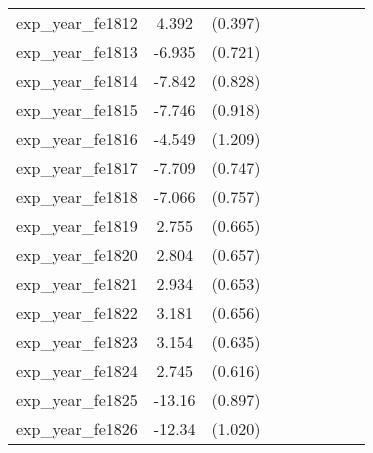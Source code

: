 {\begin{tabular}{l*{4}{cc}}
exp\_year\_fe1812&    4.392\sym{***}&  (0.397)&                  &         &                  &         &                  &         \\
exp\_year\_fe1813&   -6.935\sym{***}&  (0.721)&                  &         &                  &         &                  &         \\
exp\_year\_fe1814&   -7.842\sym{***}&  (0.828)&                  &         &                  &         &                  &         \\
exp\_year\_fe1815&   -7.746\sym{***}&  (0.918)&                  &         &                  &         &                  &         \\
exp\_year\_fe1816&   -4.549\sym{***}&  (1.209)&                  &         &                  &         &                  &         \\
exp\_year\_fe1817&   -7.709\sym{***}&  (0.747)&                  &         &                  &         &                  &         \\
exp\_year\_fe1818&   -7.066\sym{***}&  (0.757)&                  &         &                  &         &                  &         \\
exp\_year\_fe1819&    2.755\sym{***}&  (0.665)&                  &         &                  &         &                  &         \\
exp\_year\_fe1820&    2.804\sym{***}&  (0.657)&                  &         &                  &         &                  &         \\
exp\_year\_fe1821&    2.934\sym{***}&  (0.653)&                  &         &                  &         &                  &         \\
exp\_year\_fe1822&    3.181\sym{***}&  (0.656)&                  &         &                  &         &                  &         \\
exp\_year\_fe1823&    3.154\sym{***}&  (0.635)&                  &         &                  &         &                  &         \\
exp\_year\_fe1824&    2.745\sym{***}&  (0.616)&                  &         &                  &         &                  &         \\
exp\_year\_fe1825&   -13.16\sym{***}&  (0.897)&                  &         &                  &         &                  &         \\
exp\_year\_fe1826&   -12.34\sym{***}&  (1.020)&                  &         &                  &         &                  &         \\

\end{tabular}}
